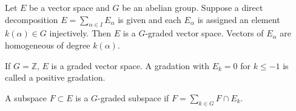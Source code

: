 Let $E$ be a vector space and $G$ be an abelian group. Suppose a direct decomposition $E = \sum_{\alpha \in I} E_\alpha$ is given and each $E_\alpha$ is assigned an element $k(\alpha) \in G$ injectively. Then $E$ is a $G$-graded vector space. Vectors of $E_\alpha$ are homogeneous of degree $k(\alpha)$.

If $G = \mathbb{Z}$, $E$ is a graded vector space. A gradation with $E_k = 0$ for $k \leq -1$ is called a positive gradation.

A subspace $F \subset E$ is a $G$-graded subspace if $F = \sum_{k \in G} F \cap E_k$.
